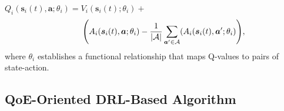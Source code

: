 \documentclass[12pt,draftclsnofoot,onecolumn]{IEEEtran}
\begin{document}
$Q_i(\boldsymbol{s}_i(t), \boldsymbol{a}; \theta_i) = V_i(\boldsymbol{s}_i(t);\theta_i) +$
\begin{alignat}{1}
	\hspace{0.94cm} \Bigg( A_i(\boldsymbol{s}_i(t),\boldsymbol{a};\theta_i) - {1 \over |\mathcal{A}|} \sum\limits_{\boldsymbol{a}' \in \mathcal{A}}(A_i(\boldsymbol{s}_i(t),\boldsymbol{a}';\theta_i) \Bigg),
	\label{25}  
\end{alignat}
where $\theta_i$ establishes a functional relationship that maps Q-values to pairs of state-action.





\subsection{QoE-Oriented DRL-Based Algorithm}
\label{section:1}

\end{document}

